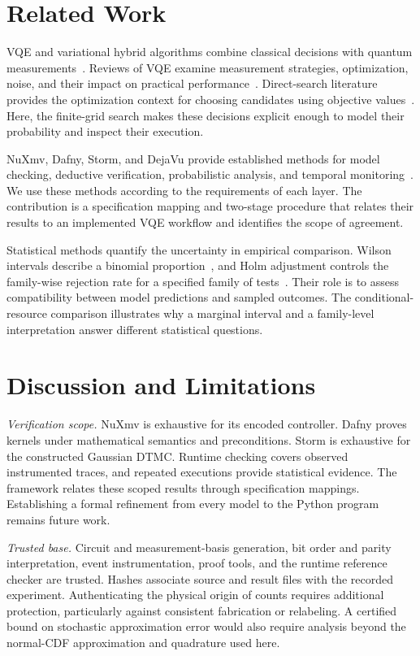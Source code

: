 \documentclass[conference]{IEEEtran}
\begin{document}
\section{Related Work}
VQE and variational hybrid algorithms combine classical decisions with quantum measurements~\cite{peruzzo2014,mcclean2016}. Reviews of VQE examine measurement strategies, optimization, noise, and their impact on practical performance~\cite{tilly2022}. Direct-search literature provides the optimization context for choosing candidates using objective values~\cite{kolda2003}. Here, the finite-grid search makes these decisions explicit enough to model their probability and inspect their execution.

NuXmv, Dafny, Storm, and DejaVu provide established methods for model checking, deductive verification, probabilistic analysis, and temporal monitoring~\cite{nuxmv,dafny,storm,dejavu}. We use these methods according to the requirements of each layer. The contribution is a specification mapping and two-stage procedure that relates their results to an implemented VQE workflow and identifies the scope of agreement.

Statistical methods quantify the uncertainty in empirical comparison. Wilson intervals describe a binomial proportion~\cite{wilson}, and Holm adjustment controls the family-wise rejection rate for a specified family of tests~\cite{holm}. Their role is to assess compatibility between model predictions and sampled outcomes. The conditional-resource comparison illustrates why a marginal interval and a family-level interpretation answer different statistical questions.

\section{Discussion and Limitations}
\label{sec:limitations}
\emph{Verification scope.} NuXmv is exhaustive for its encoded controller. Dafny proves kernels under mathematical semantics and preconditions. Storm is exhaustive for the constructed Gaussian DTMC. Runtime checking covers observed instrumented traces, and repeated executions provide statistical evidence. The framework relates these scoped results through specification mappings. Establishing a formal refinement from every model to the Python program remains future work.

\emph{Trusted base.} Circuit and measurement-basis generation, bit order and parity interpretation, event instrumentation, proof tools, and the runtime reference checker are trusted. Hashes associate source and result files with the recorded experiment. Authenticating the physical origin of counts requires additional protection, particularly against consistent fabrication or relabeling. A certified bound on stochastic approximation error would also require analysis beyond the normal-CDF approximation and quadrature used here.
\end{document}
